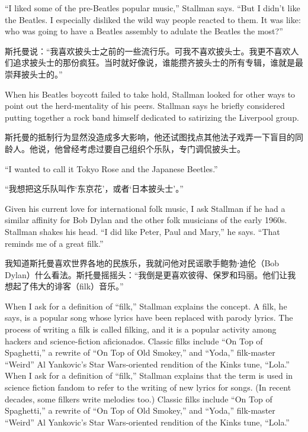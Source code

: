 \ifdefined\eng
``I liked some of the pre-Beatles popular music,'' Stallman says. ``But I didn't like the Beatles. I especially disliked the wild way people reacted to them. It was like: who was going to have a Beatles assembly to adulate the Beatles the most?''
\fi

\ifdefined\chs
斯托曼说：``我喜欢披头士之前的一些流行乐。可我不喜欢披头士。我更不喜欢人们追求披头士的那份疯狂。当时就好像说，谁能攒齐披头士的所有专辑，谁就是最崇拜披头士的。''
\fi

\ifdefined\eng
When his Beatles boycott failed to take hold, Stallman looked for other ways to point out the herd-mentality of his peers. Stallman says he briefly considered putting together a rock band himself dedicated to satirizing the Liverpool group.
\fi

\ifdefined\chs
斯托曼的抵制行为显然没造成多大影响，他还试图找点其他法子戏弄一下盲目的同龄人。他说，他曾经考虑过要自己组织个乐队，专门调侃披头士。
\fi

\ifdefined\eng
``I wanted to call it Tokyo Rose and the Japanese Beetles.''
\fi

\ifdefined\chs
``我想把这乐队叫作`东京花'，或者`日本披头士'。''
\fi

\ifdefined\eng
Given his current love for international folk music, I ask Stallman if he had a similar affinity for Bob Dylan and the other folk musicians of the early 1960s. Stallman shakes his head. ``I did like Peter, Paul and Mary,'' he says. ``That reminds me of a great filk.''
\fi

\ifdefined\chs
我知道斯托曼喜欢世界各地的民族乐，我就问他对民谣歌手鲍勃⋅迪伦（Bob Dylan）什么看法。斯托曼摇摇头：``我倒是更喜欢彼得、保罗和玛丽。他们让我想起了伟大的诽客（filk）音乐。''
\fi

\ifdefined\eng
\ifdefined\vone
When I ask for a definition of ``filk,'' Stallman explains the concept. A filk, he says, is a popular song whose lyrics have been replaced with parody lyrics. The process of writing a filk is called filking, and it is a popular activity among hackers and science-fiction aficionados. Classic filks include ``On Top of Spaghetti,'' a rewrite of ``On Top of Old Smokey,'' and ``Yoda,'' filk-master ``Weird'' Al Yankovic's Star Wars-oriented rendition of the Kinks tune, ``Lola.''
\fi
\ifdefined\vtwo
When I ask for a definition of ``filk,'' Stallman explains that the term is used in science fiction fandom to refer to the writing of new lyrics for songs.  (In recent decades, some filkers write melodies too.)  Classic filks include ``On Top of Spaghetti,'' a rewrite of ``On Top of Old Smokey,'' and ``Yoda,'' filk-master ``Weird'' Al Yankovic's Star Wars-oriented rendition of the Kinks tune, ``Lola.''
\fi
\fi

